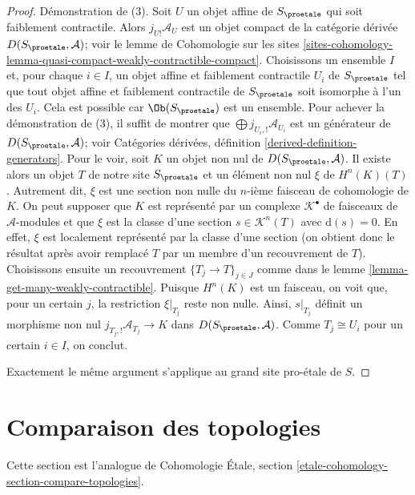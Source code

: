\begin{proof}
Démonstration de (3). Soit $U$ un objet affine de $S_\proetale$ qui soit
faiblement contractile. Alors $j_{U!}\mathcal{A}_U$ est un objet compact
de la catégorie dérivée $D(S_\proetale, \mathcal{A})$; voir le
lemme de Cohomologie sur les sites
\ref{sites-cohomology-lemma-quasi-compact-weakly-contractible-compact}.
Choisissons un ensemble $I$ et, pour chaque $i \in I$, un objet affine et faiblement contractile
$U_i$ de $S_\proetale$ tel que tout objet affine et faiblement contractile
de $S_\proetale$ soit isomorphe à l'un des $U_i$. Cela est possible
car $\Ob(S_\proetale)$ est un ensemble. Pour achever la démonstration de (3), il suffit
de montrer que $\bigoplus j_{U_i, !}\mathcal{A}_{U_i}$ est un générateur
de $D(S_\proetale, \mathcal{A})$; voir
Catégories dérivées, définition \ref{derived-definition-generators}.
Pour le voir, soit $K$ un objet non nul
de $D(S_\proetale, \mathcal{A})$. Il existe alors un objet $T$
de notre site $S_\proetale$ et un élément non nul $\xi$ de $H^n(K)(T)$.
Autrement dit, $\xi$ est une section non nulle du $n$-ième faisceau de cohomologie
de $K$.
On peut supposer que $K$ est représenté par un complexe $\mathcal{K}^\bullet$
de faisceaux de $\mathcal{A}$-modules et que $\xi$ est la classe d'une
section $s \in \mathcal{K}^n(T)$ avec $\text{d}(s) = 0$.
En effet, $\xi$ est localement représenté par la classe d'une section
(on obtient donc le résultat après avoir remplacé $T$ par un membre d'un recouvrement de $T$).
Choisissons ensuite un recouvrement $\{T_j \to T\}_{j \in J}$
comme dans le lemme \ref{lemma-get-many-weakly-contractible}.
Puisque $H^n(K)$ est un faisceau, on voit que, pour un certain $j$, la restriction
$\xi|_{T_j}$ reste non nulle. Ainsi, $s|_{T_j}$ définit un morphisme non nul
$j_{T_j, !}\mathcal{A}_{T_j} \to K$ dans $D(S_\proetale, \mathcal{A})$.
Comme $T_j \cong U_i$ pour un certain $i \in I$, on conclut.

\medskip\noindent
Exactement le même argument s'applique au grand site pro-\'etale de $S$.
\end{proof}







\section{Comparaison des topologies}
\label{section-compare-topologies}

\noindent
Cette section est l'analogue de
Cohomologie \'Etale, section \ref{etale-cohomology-section-compare-topologies}.

